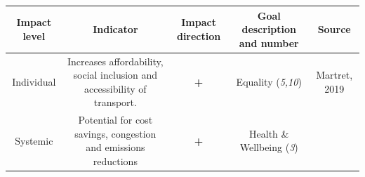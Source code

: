\documentclass[
]{book}
\begin{document}
\begin{longtable}[]{@{}ccccc@{}}
\toprule
\begin{minipage}[b]{0.17\columnwidth}\centering
Impact level\strut
\end{minipage} & \begin{minipage}[b]{0.16\columnwidth}\centering
Indicator\strut
\end{minipage} & \begin{minipage}[b]{0.17\columnwidth}\centering
Impact direction\strut
\end{minipage} & \begin{minipage}[b]{0.17\columnwidth}\centering
Goal description and number\strut
\end{minipage} & \begin{minipage}[b]{0.17\columnwidth}\centering
Source\strut
\end{minipage}\tabularnewline
\midrule
\endhead
\begin{minipage}[t]{0.17\columnwidth}\centering
Individual\strut
\end{minipage} & \begin{minipage}[t]{0.16\columnwidth}\centering
Increases affordability, social inclusion and accessibility of transport.\strut
\end{minipage} & \begin{minipage}[t]{0.17\columnwidth}\centering
\textbf{+}\strut
\end{minipage} & \begin{minipage}[t]{0.17\columnwidth}\centering
Equality (\emph{5,10})\strut
\end{minipage} & \begin{minipage}[t]{0.17\columnwidth}\centering
Martret, 2019\strut
\end{minipage}\tabularnewline
\begin{minipage}[t]{0.17\columnwidth}\centering
Systemic\strut
\end{minipage} & \begin{minipage}[t]{0.16\columnwidth}\centering
Potential for cost savings, congestion and emissions reductions\strut
\end{minipage} & \begin{minipage}[t]{0.17\columnwidth}\centering
\textbf{+}\strut
\end{minipage} & \begin{minipage}[t]{0.17\columnwidth}\centering
Health \& Wellbeing (\emph{3})\strut
\end{minipage} & \begin{minipage}[t]{0.17\columnwidth}\centering

\end{minipage}
\end{longtable}
\end{document}

